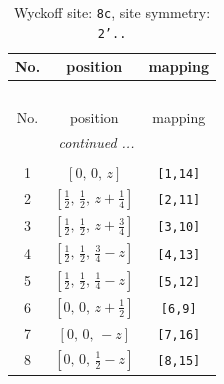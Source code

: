 \documentclass[fleqn,8pt]{jsarticle}
\begin{document}
\renewcommand{\arraystretch}{1.2}
\begin{longtable}{ccc}
\caption{Wyckoff site: {\tt 8c}, site symmetry: {\tt 2'..}}
 \\
 \hline \hline
No. & position & mapping \\ \hline \endfirsthead

\multicolumn{2}{l}{\tablename\ \thetable{}} \\
 \hline \hline
No. & position & mapping \\ \hline \endhead

 \hline \hline
\multicolumn{2}{r}{\footnotesize\it continued ...} \\ \endfoot

 \hline \hline
\multicolumn{2}{r}{} \\ \endlastfoot

1 & $\left[ 0,\, 0,\, z \right]$ & {\tt [1,14]} \\ \hline
2 & $\left[ \frac{1}{2},\, \frac{1}{2},\, z + \frac{1}{4} \right]$ & {\tt [2,11]} \\ \hline
3 & $\left[ \frac{1}{2},\, \frac{1}{2},\, z + \frac{3}{4} \right]$ & {\tt [3,10]} \\ \hline
4 & $\left[ \frac{1}{2},\, \frac{1}{2},\, \frac{3}{4} - z \right]$ & {\tt [4,13]} \\ \hline
5 & $\left[ \frac{1}{2},\, \frac{1}{2},\, \frac{1}{4} - z \right]$ & {\tt [5,12]} \\ \hline
6 & $\left[ 0,\, 0,\, z + \frac{1}{2} \right]$ & {\tt [6,9]} \\ \hline
7 & $\left[ 0,\, 0,\, - z \right]$ & {\tt [7,16]} \\ \hline
8 & $\left[ 0,\, 0,\, \frac{1}{2} - z \right]$ & {\tt [8,15]} \\
\end{longtable}
\renewcommand{\arraystretch}{1.2}
\end{document}
